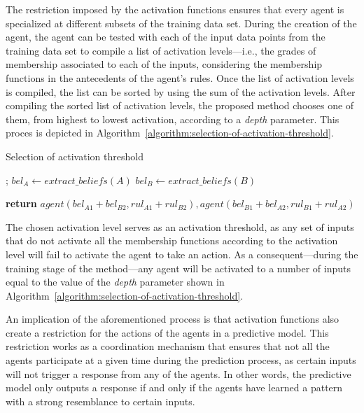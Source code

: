 \documentclass{ieeeaccess}
\begin{document}
The restriction imposed by the activation functions ensures that every
agent is specialized at different subsets of the training data
set. During the creation of the agent, the agent can be tested with
each of the input data points from the training data set to compile a
list of activation levels---i.e., the grades of membership associated
to each of the inputs, considering the membership functions in the
antecedents of the agent's rules. Once the list of activation levels
is compiled, the list can be sorted by using the sum of the activation
levels. After compiling the sorted list of activation levels, the proposed
method chooses one of them, from highest to lowest activation,
according to a \textit{depth} parameter. This proces is depicted in
Algorithm~\ref{algorithm:selection-of-activation-threshold}.

\begin{algorithm}
\caption{Selection of activation threshold}
    \label{algorithm:selection-of-activation-threshold}
\begin{algorithmic}[1]
    ;
    \State $bel_A\gets extract\_beliefs(A)$
    \State $bel_B\gets extract\_beliefs(B)$

    \State \textbf{return} $agent(bel_{A1} + bel_{B2}, rul_{A1} + rul_{B2}),
    agent(bel_{B1} + bel_{A2}, rul_{B1} + rul_{A2})$
    \EndProcedure
\end{algorithmic}
\end{algorithm}


The chosen activation level serves as an activation threshold, as any set of
inputs that do not activate all the membership functions according to the
activation level will fail to activate the agent to take an action. As a
consequent---during the training stage of the method---any agent will be
activated to a number of inputs equal to the value of the \textit{depth}
parameter shown in Algorithm~\ref{algorithm:selection-of-activation-threshold}.

An implication of the aforementioned process is that activation functions also
create a restriction for the actions of the agents in a predictive model. This
restriction works as a coordination mechanism that ensures that not all the
agents participate at a given time during the prediction process, as certain
inputs will not trigger a response from any of the agents. In other words, the
predictive model only outputs a response if and only if the agents have learned
a pattern with a strong resemblance to certain inputs.
\end{document}
